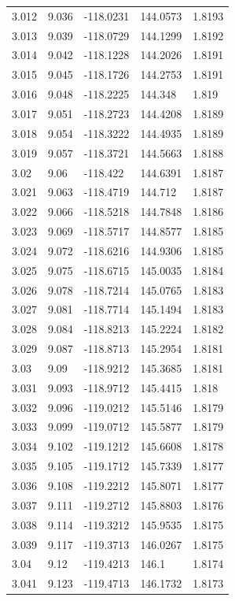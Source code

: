 \begin{tabular}{lllll}
3.012 & 9.036 & -118.0231 & 144.0573 & 1.8193 \\
3.013 & 9.039 & -118.0729 & 144.1299 & 1.8192 \\
3.014 & 9.042 & -118.1228 & 144.2026 & 1.8191 \\
3.015 & 9.045 & -118.1726 & 144.2753 & 1.8191 \\
3.016 & 9.048 & -118.2225 & 144.348 & 1.819 \\
3.017 & 9.051 & -118.2723 & 144.4208 & 1.8189 \\
3.018 & 9.054 & -118.3222 & 144.4935 & 1.8189 \\
3.019 & 9.057 & -118.3721 & 144.5663 & 1.8188 \\
3.02 & 9.06 & -118.422 & 144.6391 & 1.8187 \\
3.021 & 9.063 & -118.4719 & 144.712 & 1.8187 \\
3.022 & 9.066 & -118.5218 & 144.7848 & 1.8186 \\
3.023 & 9.069 & -118.5717 & 144.8577 & 1.8185 \\
3.024 & 9.072 & -118.6216 & 144.9306 & 1.8185 \\
3.025 & 9.075 & -118.6715 & 145.0035 & 1.8184 \\
3.026 & 9.078 & -118.7214 & 145.0765 & 1.8183 \\
3.027 & 9.081 & -118.7714 & 145.1494 & 1.8183 \\
3.028 & 9.084 & -118.8213 & 145.2224 & 1.8182 \\
3.029 & 9.087 & -118.8713 & 145.2954 & 1.8181 \\
3.03 & 9.09 & -118.9212 & 145.3685 & 1.8181 \\
3.031 & 9.093 & -118.9712 & 145.4415 & 1.818 \\
3.032 & 9.096 & -119.0212 & 145.5146 & 1.8179 \\
3.033 & 9.099 & -119.0712 & 145.5877 & 1.8179 \\
3.034 & 9.102 & -119.1212 & 145.6608 & 1.8178 \\
3.035 & 9.105 & -119.1712 & 145.7339 & 1.8177 \\
3.036 & 9.108 & -119.2212 & 145.8071 & 1.8177 \\
3.037 & 9.111 & -119.2712 & 145.8803 & 1.8176 \\
3.038 & 9.114 & -119.3212 & 145.9535 & 1.8175 \\
3.039 & 9.117 & -119.3713 & 146.0267 & 1.8175 \\
3.04 & 9.12 & -119.4213 & 146.1 & 1.8174 \\
3.041 & 9.123 & -119.4713 & 146.1732 & 1.8173 \\

\end{tabular}
